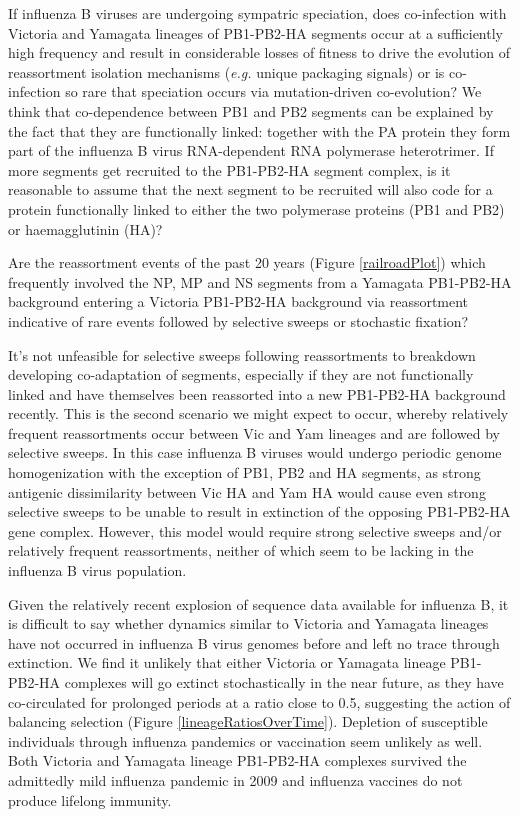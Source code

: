 \documentclass[11pt,oneside,letterpaper]{article}
\begin{document}
If influenza B viruses are undergoing sympatric speciation, does co-infection with Victoria and Yamagata lineages of PB1-PB2-HA segments occur at a sufficiently high frequency and result in considerable losses of fitness to drive the evolution of reassortment isolation mechanisms (\textit{e.g.} unique packaging signals) or is co-infection so rare that speciation occurs via mutation-driven co-evolution?
We think that co-dependence between PB1 and PB2 segments can be explained by the fact that they are functionally linked: together with the PA protein they form part of the influenza B virus RNA-dependent RNA polymerase heterotrimer.
If more segments get recruited to the PB1-PB2-HA segment complex, is it reasonable to assume that the next segment to be recruited will also code for a protein functionally linked to either the two polymerase proteins (PB1 and PB2) or haemagglutinin (HA)?

Are the reassortment events of the past 20 years (Figure \ref{railroadPlot}) which frequently involved the NP, MP and NS segments from a Yamagata PB1-PB2-HA background entering a Victoria PB1-PB2-HA background via reassortment indicative of rare events followed by selective sweeps or stochastic fixation?

It's not unfeasible for selective sweeps following reassortments to breakdown developing co-adaptation of segments, especially if they are not functionally linked and have themselves been reassorted into a new PB1-PB2-HA background recently.
This is the second scenario we might expect to occur, whereby relatively frequent reassortments occur between Vic and Yam lineages and are followed by selective sweeps.
In this case influenza B viruses would undergo periodic genome homogenization with the exception of PB1, PB2 and HA segments, as strong antigenic dissimilarity between Vic HA and Yam HA would cause even strong selective sweeps to be unable to result in extinction of the opposing PB1-PB2-HA gene complex.
However, this model would require strong selective sweeps and/or relatively frequent reassortments, neither of which seem to be lacking in the influenza B virus population.


Given the relatively recent explosion of sequence data available for influenza B, it is difficult to say whether dynamics similar to Victoria and Yamagata lineages have not occurred in influenza B virus genomes before and left no trace through extinction.
We find it unlikely that either Victoria or Yamagata lineage PB1-PB2-HA complexes will go extinct stochastically in the near future, as they have co-circulated for prolonged periods at a ratio close to 0.5, suggesting the action of balancing selection (Figure \ref{lineageRatiosOverTime}).
Depletion of susceptible individuals through influenza pandemics or vaccination seem unlikely as well.
Both Victoria and Yamagata lineage PB1-PB2-HA complexes survived the admittedly mild influenza pandemic in 2009 and influenza vaccines do not produce lifelong immunity.
\end{document}
